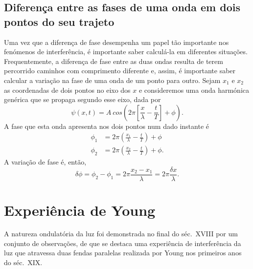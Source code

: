 \subsection{Diferença entre as fases de uma onda em dois pontos do seu trajeto}
\label{sec:dfidx}
Uma vez que a diferença de fase desempenha um papel tão importante nos fenómenos
de interferência, é importante saber calculá-la em diferentes situações.
Frequentemente, a diferença de fase entre as duas ondas resulta de terem
percorrido caminhos com comprimento diferente e, assim, é importante saber
calcular a variação na fase de uma onda de um ponto para outro. 
Sejam $x_1$ e $x_2$ as coordenadas de dois pontos no eixo dos $x$ e consideremos
uma onda harmónica genérica que se propaga segundo esse eixo, dada por
\begin{equation*}
\psi(x,t)=A\
    cos\left(2\pi\left[\frac{x}{\lambda}-\frac{t}{T}\right]+\phi\right).
\end{equation*}
A fase que esta onda apresenta nos dois pontos num dado instante é
\begin{align*}
\phi_1&=2\pi\left(\frac{x_1}{\lambda}-\frac{t}{T}\right)+\phi\\
\phi_2&=2\pi\left(\frac{x_2}{\lambda}-\frac{t}{T}\right)+\phi.
\end{align*}
A variação de fase é, então,
\begin{equation*}
  \delta\phi=\phi_2-\phi_1=2\pi\frac{x_2-x_1}{\lambda} = 2\pi\frac{\delta
  x}{\lambda}.
\end{equation*}

\section{Experiência de Young}
A natureza ondulatória da luz foi demonstrada no final do séc.~XVIII por um
conjunto de observações, de que se destaca uma experiência de interferência da
luz que atravessa duas fendas paralelas realizada por Young nos primeiros anos
do séc.~XIX.

